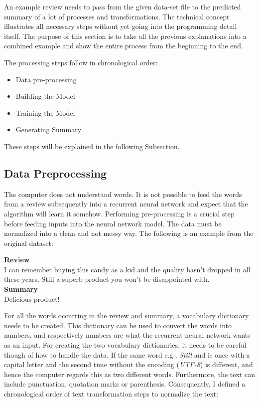 An example review needs to pass from the given data-set file to the predicted summary of a lot of processes and transformations. The technical concept illustrates all necessary steps without yet going into the programming detail itself. The purpose of this section is to take all the previous explanations into a combined example and show the entire process from the beginning to the end. 

The processing steps follow in chronological order:

\begin{itemize}
	\item Data pre-processing
	\item Building the Model
	\item Training the Model
	\item Generating Summary
\end{itemize}

These steps will be explained in the following Subsection.

\subsection{Data Preprocessing}\label{ss:preprop}

The computer does not understand words. It is not possible to feed the words from a review subsequently into a recurrent neural network and expect that the algorithm will learn it somehow. Performing pre-processing is a crucial step before feeding inputs into the neural network model. The data must be normalized into a clean and not messy way. The following is an example from the original dataset:

\begin{tcolorbox}
	\textbf{Review} \\
	I can remember buying this candy as a kid and the quality hasn't dropped in all these years. Still a superb product you won't be disappointed with. \\
	
	\textbf{Summary} \\
	Delicious product!
\end{tcolorbox}

For all the words occurring in the review and summary, a vocabulary dictionary needs to be created. This dictionary can be used to convert the words into numbers, and respectively numbers are what the recurrent neural network wants as an input. For creating the two vocabulary dictionaries, it needs to be careful though of how to handle the data. If the same word e.g., \textit{Still} and  is once with a capital letter and the second time without the encoding (\textit{UTF-8}) is different, and hence the computer regards this as two different words. Furthermore, the text can include punctuation, quotation marks or parenthesis. Consequently, I defined a chronological order of text transformation steps to normalize the text:

